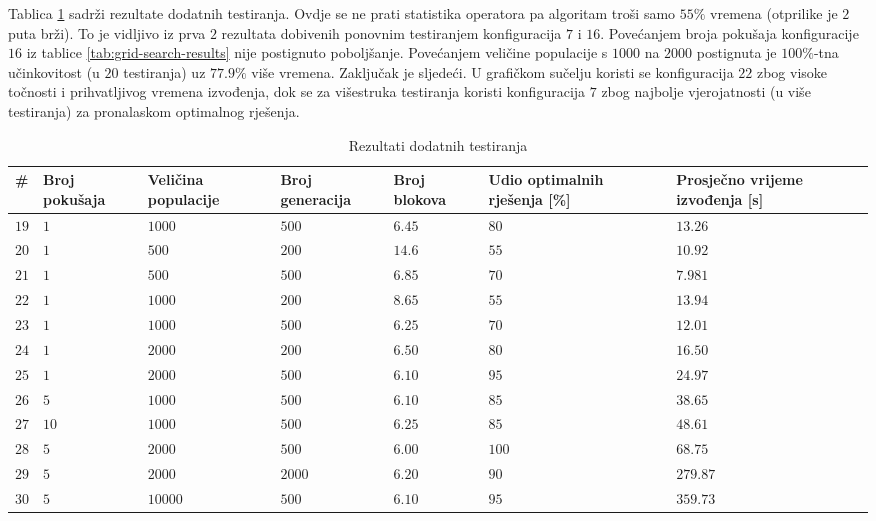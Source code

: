 \documentclass[times, utf8, diplomski]{fer}
\begin{document}
Tablica \ref{tab:additional-results} sadrži rezultate dodatnih testiranja. Ovdje se ne prati statistika operatora pa algoritam troši samo $55\%$ vremena (otprilike je $2$ puta brži). To je vidljivo iz prva $2$ rezultata dobivenih ponovnim testiranjem konfiguracija $7$ i $16$. Povećanjem broja pokušaja konfiguracije $16$ iz tablice \ref{tab:grid-search-results} nije postignuto poboljšanje. Povećanjem veličine populacije s $1000$ na $2000$ postignuta je $100\%$-tna učinkovitost (u $20$ testiranja) uz $77.9\%$ više vremena. Zaključak je sljedeći. U grafičkom sučelju koristi se konfiguracija $22$ zbog visoke točnosti i prihvatljivog vremena izvođenja, dok se za višestruka testiranja koristi konfiguracija $7$ zbog najbolje vjerojatnosti (u više testiranja) za pronalaskom optimalnog rješenja.

\begin{table}
	\centering
	\caption{Rezultati dodatnih testiranja}
	\label{tab:additional-results}
	\begin{tabular}{
			|>{\centering\arraybackslash}m{4mm}
			|>{\centering\arraybackslash}m{19mm}
			|>{\centering\arraybackslash}m{19mm}
			|>{\centering\arraybackslash}m{19mm}
			|>{\centering\arraybackslash}m{18mm}
			|>{\centering\arraybackslash}m{20mm}
			|>{\centering\arraybackslash}m{18mm}|}
		\hline
		  \textbf{\#}
		& \textbf{Broj \linebreak pokušaja}
		& \textbf{Veličina \linebreak populacije}
		& \textbf{Broj \linebreak generacija}
		& \textbf{Broj \linebreak blokova}
		& \textbf{Udio \linebreak optimalnih \linebreak rješenja [\%]}
		& \textbf{Prosječno vrijeme izvođenja [s]} \\ \hline
		
		$19$		& $1$	& $1000$	& $500$		& $6.45$	& $80$		& $13.26$	\\ \hline
		$20$		& $1$	& $500$		& $200$		& $14.6$	& $55$		& $10.92$	\\ \hline
		$21$		& $1$	& $500$		& $500$		& $6.85$	& $70$		& $7.981$	\\ \hline
		$22$		& $1$	& $1000$	& $200$		& $8.65$	& $55$		& $13.94$	\\ \hline
		$23$		& $1$	& $1000$	& $500$		& $6.25$	& $70$		& $12.01$	\\ \hline
		$24$		& $1$	& $2000$	& $200$		& $6.50$	& $80$		& $16.50$	\\ \hline
		$25$		& $1$	& $2000$	& $500$		& $6.10$	& $95$		& $24.97$	\\ \hline
		$26$		& $5$	& $1000$	& $500$		& $6.10$	& $85$		& $38.65$	\\ \hline
		$27$		& $10$	& $1000$	& $500$		& $6.25$	& $85$		& $48.61$	\\ \hline
		$28$		& $5$	& $2000$	& $500$		& $6.00$	& $100$		& $68.75$	\\ \hline
		$29$		& $5$	& $2000$	& $2000$	& $6.20$	& $90$		& $279.87$	\\ \hline
		$30$		& $5$	& $10000$	& $500$		& $6.10$	& $95$		& $359.73$	\\ \hline
		

\end{tabular}
\end{table}
\end{document}
